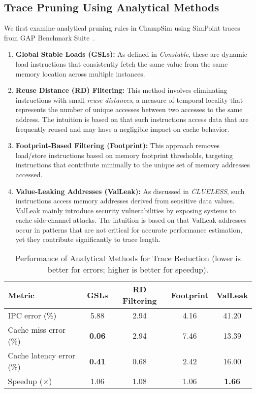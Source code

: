 \subsection*{Trace Pruning Using Analytical Methods}
We first examine analytical pruning rules in ChampSim using SimPoint traces from GAP Benchmark Suite~\cite{beamer2017gapbenchmarksuite}.
\begin{enumerate}[nosep, leftmargin=*]
    \item \textbf{Global Stable Loads (GSLs):} As defined in \textit{Constable}\cite{constable}, these are dynamic load instructions that consistently fetch the same value from the same memory location across multiple instances.  
    \item \textbf{Reuse Distance (RD) Filtering:} This method involves eliminating instructions with small \emph{reuse distances}, a measure of temporal locality that represents the number of unique accesses between two accesses to the same address. The intuition is based on that such instructions access  data that are frequently reused and may have a negligible impact on cache behavior.
    \item \textbf{Footprint-Based Filtering (Footprint):} This approach removes load/store instructions based on memory footprint thresholds, targeting instructions that contribute minimally to the unique set of memory addresses accessed.
    \item \textbf{Value-Leaking Addresses (ValLeak):} As discussed in \emph{CLUELESS}\cite{clueless}, such instructions access memory addresses derived from sensitive data values. ValLeak mainly introduce security vulnerabilities by exposing systems to cache side-channel attacks. { The intuition is based on that ValLeak addresses occur in patterns that are not critical for accurate performance estimation, yet they contribute significantly to trace length.}
\end{enumerate} 
\begin{table}[htbp!]
\caption{Performance of Analytical Methods for Trace Reduction (lower is better for errors; higher is better for speedup).}
\label{tab:comparison_methods}
\centering
\setlength{\tabcolsep}{4pt}
\begin{adjustbox}{max width=1.09\columnwidth}
\begin{tabular}{l|cccc}
\toprule
Metric & GSLs & RD Filtering & Footprint & ValLeak \\
\midrule
IPC error (\%)             & 5.88 & {2.94} & 4.16 & 41.20 \\
Cache miss error (\%)      & \textbf{0.06} & 2.94 & 7.46 & 13.39 \\
Cache latency error (\%)   & \textbf{0.41} & 0.68 & 2.42 & 16.00 \\
Speedup ($\times$)         & 1.06 & 1.08 & 1.06 & \textbf{1.66} \\
\bottomrule
\end{tabular}
\end{adjustbox}
\end{table}
